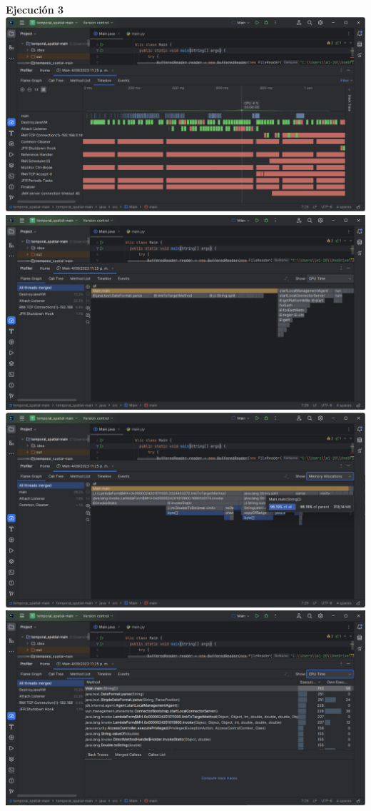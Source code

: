 \documentclass[a4paper,twocolumn,10pt]{article}
\begin{document}
\textbf{Ejecución 3\\}
\includegraphics[width=0.9\linewidth]{HP Ryzen 5500U/TimeLine 3.png}
\includegraphics[width=0.9\linewidth]{HP Ryzen 5500U/FlameGraph CPU 3.png}
\includegraphics[width=0.9\linewidth]{HP Ryzen 5500U/FlameGraph Memory Allocation 3.png}
\includegraphics[width=0.9\linewidth]{HP Ryzen 5500U/Method List CPU 3.png}
\end{document}
